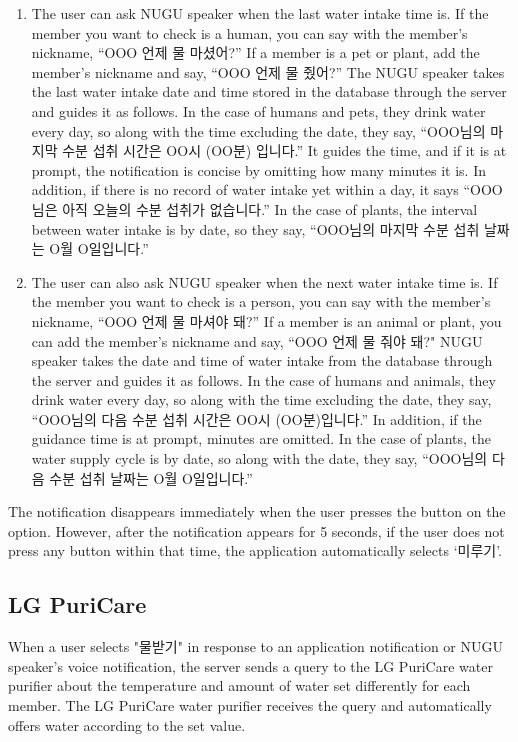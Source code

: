 \documentclass[conference]{IEEEtran}
\begin{document}
\begin{itemize}
\begin{enumerate}
\item The user can ask NUGU speaker when the last water intake time is. If the member you want to check is a human, you can say with the member's nickname, “OOO 언제 물 마셨어?” If a member is a pet or plant, add the member's nickname and say, “OOO 언제 물 줬어?” The NUGU speaker takes the last water intake date and time stored in the database through the server and guides it as follows. In the case of humans and pets, they drink water every day, so along with the time excluding the date, they say, “OOO님의 마지막 수분 섭취 시간은 OO시 (OO분) 입니다.” It guides the time, and if it is at prompt, the notification is concise by omitting how many minutes it is. In addition, if there is no record of water intake yet within a day, it says “OOO님은 아직 오늘의 수분 섭취가 없습니다.” In the case of plants, the interval between water intake is by date, so they say, “OOO님의 마지막 수분 섭취 날짜는 O월 O일입니다.”

\item The user can also ask NUGU speaker when the next water intake time is. If the member you want to check is a person, you can say with the member's nickname, “OOO 언제 물 마셔야 돼?” If a member is an animal or plant, you can add the member's nickname and say, “OOO 언제 물 줘야 돼?" NUGU speaker takes the date and time of water intake from the database through the server and guides it as follows. In the case of humans and animals, they drink water every day, so along with the time excluding the date, they say, “OOO님의 다음 수분 섭취 시간은 OO시 (OO분)입니다.” In addition, if the guidance time is at prompt, minutes are omitted. In the case of plants, the water supply cycle is by date, so along with the date, they say, “OOO님의 다음 수분 섭취 날짜는 O월 O일입니다.”
\end{enumerate}

The notification disappears immediately when the user presses the button on the option. However, after the notification appears for 5 seconds, if the user does not press any button within that time, the application automatically selects ‘미루기’.

\end{itemize}

\subsection{LG PuriCare}
\setlength{\parindent}{2ex}

When a user selects "물받기" in response to an application notification or NUGU speaker's voice notification, the server sends a query to the LG PuriCare water purifier about the temperature and amount of water set differently for each member. The LG PuriCare water purifier receives the query and automatically offers water according to the set value.
\end{document}
